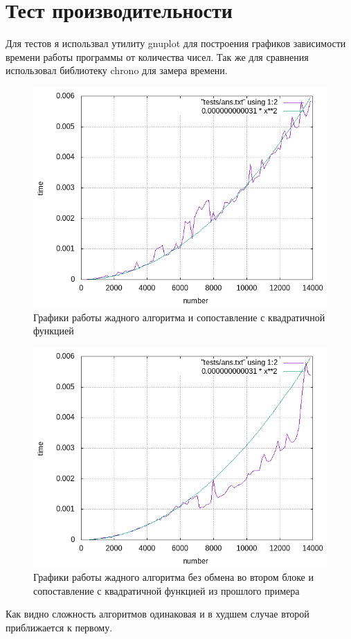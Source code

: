 
\section{Тест производительности}

Для тестов я использвал утилиту gnuplot для построения графиков зависимости времени работы программы от количества чисел. Так же для сравнения использовал библиотеку chrono для замера времени.

\begin{figure}[h]
  \begin{center}
    \includegraphics[scale=0.5]{../plots/plot1.png}
  \end{center}
  \caption{Графики работы жадного алгоритма и сопоставление с квадратичной функцией}
\end{figure}

\begin{figure}[h]
  \begin{center}
    \includegraphics[scale=0.5]{../plots/plot.png}
  \end{center}
  \caption{Графики работы жадного алгоритма без обмена во втором блоке и сопоставление с квадратичной функцией из прошлого примера}
\end{figure}

Как видно сложность алгоритмов одинаковая и в худшем случае второй приближается к первому.

\pagebreak
